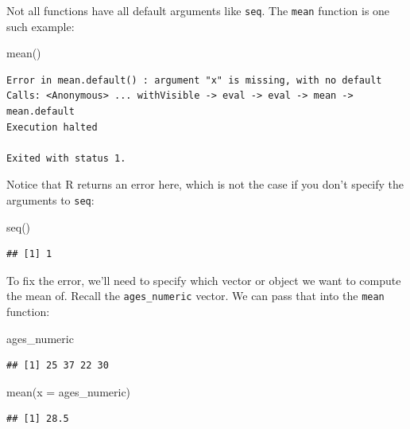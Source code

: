 \documentclass[]{tufte-book}
\newenvironment{Shaded}{\begin{snugshade}}{\end{snugshade}}
\newcommand{\AttributeTok}[1]{\textcolor[rgb]{0.77,0.63,0.00}{#1}}
\newcommand{\FunctionTok}[1]{\textcolor[rgb]{0.00,0.00,0.00}{#1}}
\newcommand{\NormalTok}[1]{#1}
\begin{document}
Not all functions have all default arguments like \texttt{seq}. The \texttt{mean} function is one such example:

\begin{Shaded}
\begin{Highlighting}[]
\FunctionTok{mean}\NormalTok{()}
\end{Highlighting}
\end{Shaded}

\begin{verbatim}
Error in mean.default() : argument "x" is missing, with no default
Calls: <Anonymous> ... withVisible -> eval -> eval -> mean -> mean.default
Execution halted

Exited with status 1.
\end{verbatim}

Notice that R returns an error here, which is not the case if you don't specify the arguments to \texttt{seq}:

\begin{Shaded}
\begin{Highlighting}[]
\FunctionTok{seq}\NormalTok{()}
\end{Highlighting}
\end{Shaded}

\begin{verbatim}
## [1] 1
\end{verbatim}

To fix the error, we'll need to specify which vector or object we want to compute the mean of. Recall the \texttt{ages\_numeric} vector. We can pass that into the \texttt{mean} function:

\begin{Shaded}
\begin{Highlighting}[]
\NormalTok{ages\_numeric}
\end{Highlighting}
\end{Shaded}

\begin{verbatim}
## [1] 25 37 22 30
\end{verbatim}

\begin{Shaded}
\begin{Highlighting}[]
\FunctionTok{mean}\NormalTok{(}\AttributeTok{x =}\NormalTok{ ages\_numeric)}
\end{Highlighting}
\end{Shaded}

\begin{verbatim}
## [1] 28.5
\end{verbatim}
\end{document}
